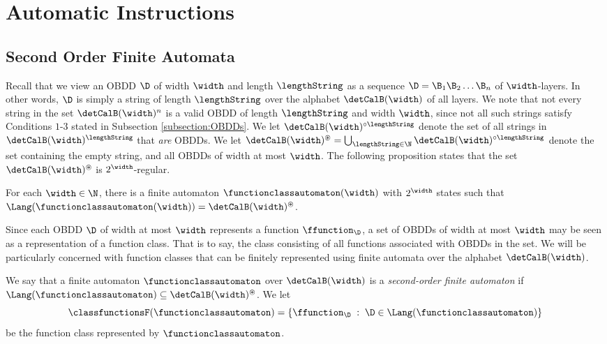 \section{Automatic Instructions}


\subsection{Second Order Finite Automata}
\label{subsection:RegularFunctionClasses}

Recall that we view an OBDD $\D$ of width $\width$ and length $\lengthString$ as 
a sequence $\D = \B_1\B_2\dots\B_n$ of $\width$-layers. In other words, $\D$ is simply
a string of length $\lengthString$ over the alphabet $\detCalB(\width)$ of all layers. 
We note that not every string in the set $\detCalB(\width)^n$ is a valid OBDD
of length $\lengthString$ and width $\width$, since not all such strings satisfy
Conditions $1$-$3$ stated in Subsection \ref{subsection:OBDDs}. We let 
$\detCalB(\width)^{\circ \lengthString}$ denote the set of all strings in 
$\detCalB(\width)^{\lengthString}$ that {\em are} OBDDs. 
We let $\detCalB(\width)^{\circledast} = \bigcup_{\lengthString\in \N} \detCalB(\width)^{\circ \lengthString}$ 
denote the set containing the empty string, and all OBDDs of width at most $\width$.
The following proposition states that the set $\detCalB(\width)^{\circledast}$ 
is $2^{\width}$-regular. 

\begin{proposition}
\label{proposition:RegularityOBDDs}
For each $\width\in \N$, there is a finite automaton $\functionclassautomaton(\width)$
with $2^{\width}$ states such that 
$\Lang(\functionclassautomaton(\width)) =  \detCalB(\width)^{\circledast}$. 
\end{proposition}

Since each OBDD $\D$ of width at most $\width$ represents a function $\ffunction_{\D}$, a set of OBDDs of width at most $\width$ may be seen as a representation of a function class. That is to say, the class consisting of all functions associated with OBDDs in the set. We will be particularly concerned with function classes that can be finitely represented using finite automata over the alphabet $\detCalB(\width)$. 

\begin{definition}
\label{definition:SecondOrderFA}
We say that a finite automaton $\functionclassautomaton$ over
$\detCalB(\width)$ is a {\em second-order finite automaton} if
$\Lang(\functionclassautomaton)\subseteq \detCalB(\width)^{\circledast}$. We let 
$$\classfunctionsF(\functionclassautomaton) = \{\ffunction_{\D}\;:\; \D\in \Lang(\functionclassautomaton)\}$$ be the function class represented by $\functionclassautomaton$. 
\end{definition}

